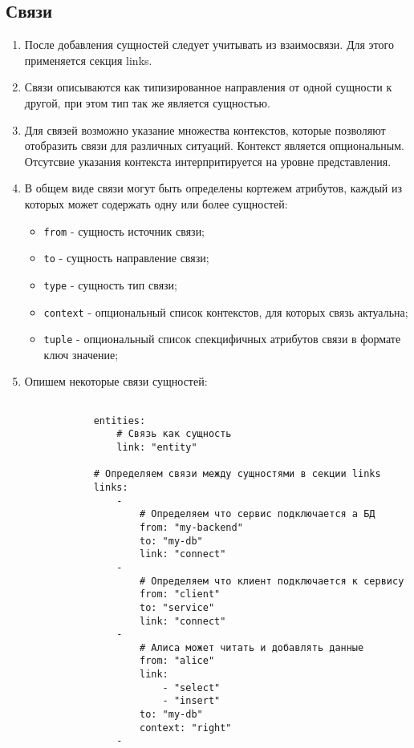 \documentclass[final]{article}
\begin{document}
    \subsection{Связи}
        \begin{enumerate}

            \item После добавления сущностей следует учитывать из взаимосвязи. 
            Для этого применяется секция links.

            \item Связи описываются как типизированное направления от одной сущности 
            к другой, при этом тип так же является сущностью. 

            \item Для связей возможно указание множества контекстов, которые 
            позволяют отобразить связи для различных ситуаций. Контекст является 
            опциональным. Отсутсвие указания контекста интерпритируется на 
            уровне представления.

            \item В общем виде связи могут быть определены кортежем атрибутов, 
            каждый из которых может содержать одну или более сущностей:

            \begin{itemize}
                \item \texttt{from} - сущность источник связи;
                \item \texttt{to} - сущность направление связи;
                \item \texttt{type} - сущность тип связи;
                \item \texttt{context} - опциональный список контекстов, для которых связь актуальна;
                \item \texttt{tuple} - опциональный список спекцифичных атрибутов 
                связи в формате ключ значение;
            \end{itemize}

            \item Опишем некоторые связи сущностей:

            \begin{verbatim}

            entities:
                # Связь как сущность
                link: "entity"

            # Определяем связи между сущностями в секции links
            links:         
                -              
                    # Определяем что сервис подключается а БД
                    from: "my-backend"
                    to: "my-db"
                    link: "connect"
                -
                    # Определяем что клиент подключается к сервису
                    from: "client"
                    to: "service"
                    link: "connect"
                -              
                    # Алиса может читать и добавлять данные
                    from: "alice"
                    link:
                        - "select"
                        - "insert"
                    to: "my-db"
                    context: "right"
                - 


\end{verbatim}
\end{enumerate}
\end{document}
